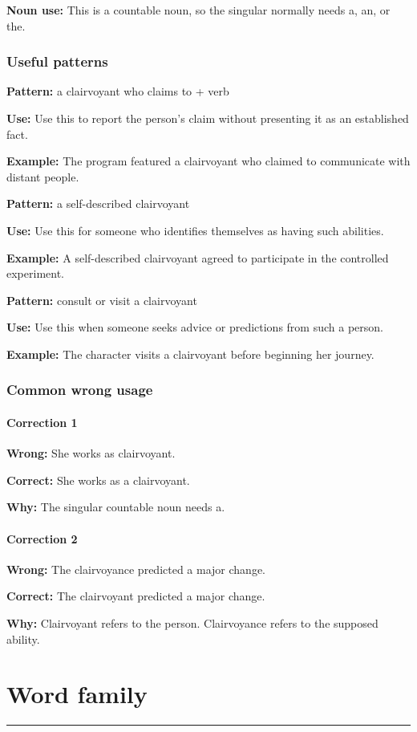 \documentclass[11pt]{article}
\newcommand{\sectionrule}{\par\vspace{-0.5em}\noindent\textcolor{Accent}{\rule{\linewidth}{0.6pt}}\par}
\begin{document}
\textbf{Noun use:} This is a countable noun, so the singular normally needs a, an, or the.

\subsubsection{Useful patterns}
\textbf{Pattern:} a clairvoyant who claims to + verb

\textbf{Use:} Use this to report the person's claim without presenting it as an established fact.

\textbf{Example:} The program featured a clairvoyant who claimed to communicate with distant people.

\textbf{Pattern:} a self-described clairvoyant

\textbf{Use:} Use this for someone who identifies themselves as having such abilities.

\textbf{Example:} A self-described clairvoyant agreed to participate in the controlled experiment.

\textbf{Pattern:} consult or visit a clairvoyant

\textbf{Use:} Use this when someone seeks advice or predictions from such a person.

\textbf{Example:} The character visits a clairvoyant before beginning her journey.

\subsubsection{Common wrong usage}
\paragraph{Correction 1}
\textbf{Wrong:} She works as clairvoyant.

\textbf{Correct:} She works as a clairvoyant.

\textbf{Why:} The singular countable noun needs a.

\paragraph{Correction 2}
\textbf{Wrong:} The clairvoyance predicted a major change.

\textbf{Correct:} The clairvoyant predicted a major change.

\textbf{Why:} Clairvoyant refers to the person. Clairvoyance refers to the supposed ability.

\section{Word family}
\sectionrule
\end{document}
